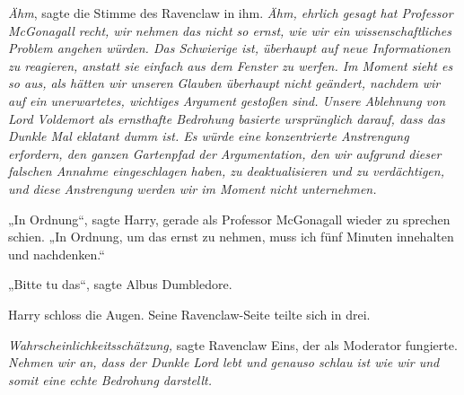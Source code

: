 \emph{Ähm}, sagte die Stimme des Ravenclaw in ihm. \emph{Ähm, ehrlich gesagt hat Professor McGonagall recht, wir nehmen das nicht so ernst, wie wir ein wissenschaftliches Problem angehen würden. Das Schwierige ist, \emph{überhaupt} auf neue Informationen zu reagieren, anstatt sie einfach aus dem Fenster zu werfen. Im Moment sieht es so aus, als hätten wir unseren Glauben \emph{überhaupt nicht} geändert, nachdem wir auf ein unerwartetes, wichtiges Argument gestoßen sind. Unsere Ablehnung von Lord Voldemort als ernsthafte Bedrohung basierte \emph{ursprünglich} darauf, dass das Dunkle Mal eklatant dumm ist. Es würde eine konzentrierte Anstrengung erfordern, den ganzen Gartenpfad der Argumentation, den wir aufgrund dieser falschen Annahme eingeschlagen haben, zu deaktualisieren und zu verdächtigen, und diese Anstrengung werden wir im Moment \emph{nicht} unternehmen.}

„In Ordnung“, sagte Harry, gerade als Professor McGonagall wieder zu sprechen schien. „In Ordnung, um das ernst zu nehmen, muss ich fünf Minuten innehalten und nachdenken.“

„Bitte tu das“, sagte Albus Dumbledore.


Harry schloss die Augen. Seine Ravenclaw-Seite teilte sich in drei.

\emph{Wahrscheinlichkeitsschätzung,} sagte Ravenclaw Eins, der als Moderator fungierte. \emph{Nehmen wir an, dass der Dunkle Lord lebt und genauso schlau ist wie wir und somit eine echte Bedrohung darstellt.}

